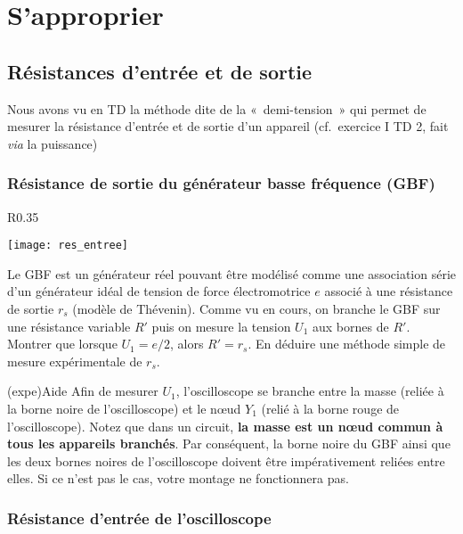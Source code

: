 \documentclass[../main/main.tex]{subfiles}
\begin{document}
\section{S'approprier}
\subsection{Résistances d'entrée et de sortie}

Nous avons vu en TD la méthode dite de la «~demi-tension~» qui permet de mesurer
la résistance d'entrée et de sortie d'un appareil (cf.\ exercice I TD 2, fait
\textit{via} la puissance)

\subsubsection{Résistance de sortie du générateur basse fréquence (GBF)}

\begin{wrapfigure}[6]{R}{0.35\textwidth}
	\vspace{-35pt}
	\begin{center}
		\texttt{[image: res\_entree]}
	\end{center}
\end{wrapfigure}

Le GBF est un générateur réel pouvant être modélisé comme une association série
d'un générateur idéal de tension de force électromotrice $e$ associé à une
résistance de sortie $r_{s}$ (modèle de Thévenin). Comme vu en cours, on branche
le GBF sur une résistance variable $R'$ puis on mesure la tension $U_1$ aux
bornes de $R'$. Montrer que lorsque $U_1 = e/2$, alors $R' = r_{s}$. En déduire
une méthode simple de mesure expérimentale de $r_{s}$.

\medskip
\vspace{10pt}

\begin{tcb}(expe){Aide}
	Afin de mesurer $U_1$, l'oscilloscope se branche entre la masse (reliée à la
	borne noire de l'oscilloscope) et le nœud $Y_1$ (relié à la borne rouge de
	l'oscilloscope). Notez que dans un circuit, \textbf{la masse est un nœud
		commun à tous les appareils branchés}.
	Par conséquent, la borne noire du GBF ainsi que les deux bornes noires de
	l'oscilloscope doivent être impérativement reliées entre elles. Si ce n'est
	pas le cas, votre montage ne fonctionnera pas.
\end{tcb}

\subsubsection{Résistance d'entrée de l'oscilloscope}
\end{document}
